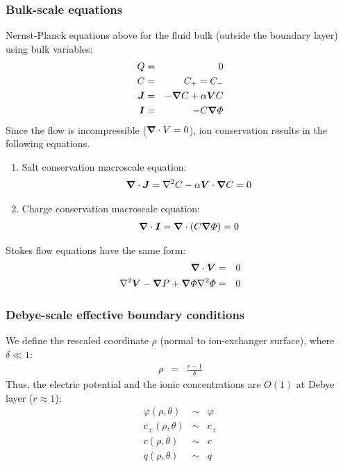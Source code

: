 \subsubsection  {Bulk-scale equations}
Nernst-Planck equations above for the fluid bulk (outside
the boundary layer) using bulk variables:
\begin{eqnarray}
  Q & = & 0 \\
  C & = & C_+ = C_- \\
\boldsymbol{J} &=& -\boldsymbol{\nabla} C + \alpha \boldsymbol{V} C \\
\boldsymbol{I} &=& -C \boldsymbol{\nabla} \varPhi
\end{eqnarray}
Since the flow is incompressible ($\boldsymbol{\nabla} \cdot V = 0$), 
ion conservation results in the following equations.

\begin{enumerate}
\item Salt conservation macroscale equation:
\begin{eqnarray}
\boldsymbol{\nabla} \cdot \boldsymbol{J} = \nabla^2 C - \alpha \boldsymbol{V} \cdot \boldsymbol{\nabla} C = 0 
\end{eqnarray}

\item Charge conservation macroscale equation:
\begin{eqnarray}
\boldsymbol{\nabla} \cdot \boldsymbol{I} = \boldsymbol{\nabla} \cdot \left( C \boldsymbol{\nabla} \varPhi \right) = 0
\end{eqnarray}
\end{enumerate}

Stokes flow equations have the same form:
\begin{eqnarray}
\boldsymbol{\nabla} \cdot \boldsymbol{V} &=& 0 \\
\nabla^2 \boldsymbol{V} - \boldsymbol{\nabla} P + \boldsymbol{\nabla} \varPhi \nabla^2 \varPhi &=& 0
\end{eqnarray}

\subsubsection{Debye-scale effective boundary conditions}
We define the rescaled coordinate $\rho$ (normal to ion-exchanger surface), where $\delta \ll 1$:
\begin{eqnarray}
  \rho &=& \frac{r-1}{\delta} 
\end{eqnarray}
Thus, the electric potential and the ionic concentrations are $O(1)$ at Debye layer ($r \approx 1$):
\begin{eqnarray}
  \varphi(\rho,\theta) &\sim& \varphi \\
  c_\pm(\rho,\theta) &\sim& c_\pm \\
  c(\rho,\theta) &\sim& c \\
  q(\rho,\theta) &\sim& q
\end{eqnarray}

